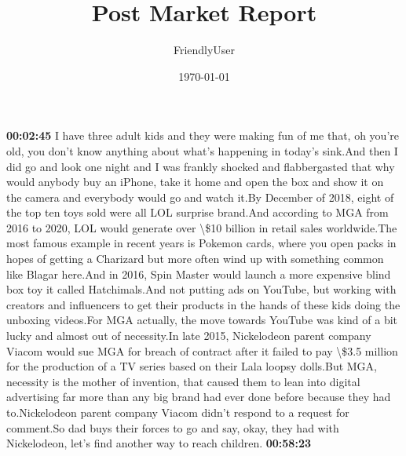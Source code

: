 \documentclass{article}%
\title{Post Market Report}%
\author{FriendlyUser}%
\date{\today}%
\begin{document}
%
\normalsize%
\textbf{00:02:45}%
\newline%
I have three adult kids and they were making fun of me that, oh you're old, you don't know anything about what's happening in today's sink.And then I did go and look one night and I was frankly shocked and flabbergasted that why would anybody buy an iPhone, take it home and open the box and show it on the camera and everybody would go and watch it.By December of 2018, eight of the top ten toys sold were all LOL surprise brand.And according to MGA from 2016 to 2020, LOL would generate over \textbackslash{}\$10 billion in retail sales worldwide.The most famous example in recent years is Pokemon cards, where you open packs in hopes of getting a Charizard but more often wind up with something common like Blagar here.And in 2016, Spin Master would launch a more expensive blind box toy it called Hatchimals.And not putting ads on YouTube, but working with creators and influencers to get their products in the hands of these kids doing the unboxing videos.For MGA actually, the move towards YouTube was kind of a bit lucky and almost out of necessity.In late 2015, Nickelodeon parent company Viacom would sue MGA for breach of contract after it failed to pay \textbackslash{}\$3.5 million for the production of a TV series based on their Lala loopsy dolls.But MGA, necessity is the mother of invention, that caused them to lean into digital advertising far more than any big brand had ever done before because they had to.Nickelodeon parent company Viacom didn't respond to a request for comment.So dad buys their forces to go and say, okay, they had with Nickelodeon, let's find another way to reach children.%
\textbf{00:58:23}%
\newline%
\end{document}
